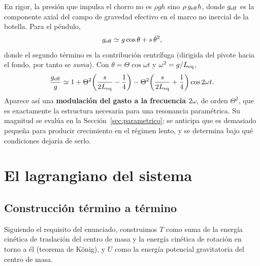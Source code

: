 \documentclass[11pt,a4paper]{article}
\begin{document}
En rigor, la presión que impulsa el chorro no es $\rho g h$ sino $\rho\,g_{\rm eff}h$, donde
$g_{\rm eff}$ es la componente axial del campo de gravedad efectivo en el marco no inercial de la
botella. Para el péndulo,
\begin{equation}
g_{\rm eff} \simeq g\cos\theta + s\,\dot\theta^2 ,
\label{eq:geff}
\end{equation}
donde el segundo término es la contribución centrífuga (dirigida del pivote hacia el fondo, por
tanto se \emph{suma}). Con $\theta=\Theta\cos\omega t$ y $\omega^2 = g/L_{\rm eq}$,
\begin{equation}
\frac{g_{\rm eff}}{g} \simeq 1 + \Theta^2\!\left(\frac{s}{2L_{\rm eq}}-\frac14\right)
 - \Theta^2\!\left(\frac{s}{2L_{\rm eq}}+\frac14\right)\cos 2\omega t .
\label{eq:geffmod}
\end{equation}
Aparece así una \textbf{modulación del gasto a la frecuencia $2\omega$}, de orden $\Theta^2$, que
es exactamente la estructura necesaria para una resonancia paramétrica. Su magnitud se evalúa en
la Sección~\ref{sec:parametrico}; se anticipa que es demasiado pequeña para producir crecimiento
en el régimen lento, y se determina bajo qué condiciones dejaría de serlo.

\section{El lagrangiano del sistema}
\label{sec:lagrangiano}

\subsection{Construcción término a término}

Siguiendo el requisito del enunciado, construimos $T$ como suma de la energía cinética de
traslación del centro de masa y la energía cinética de rotación en torno a él (teorema de König),
y $U$ como la energía potencial gravitatoria del centro de masa.
\end{document}
